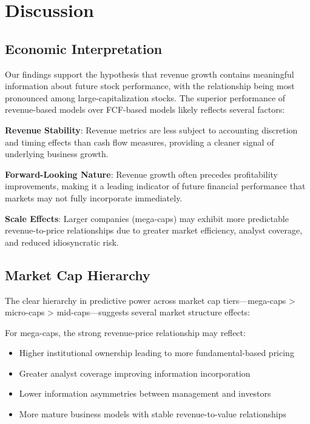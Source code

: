 \documentclass[11pt]{article}
\begin{document}
\section{Discussion}

\subsection{Economic Interpretation}

Our findings support the hypothesis that revenue growth contains meaningful information about future stock performance, with the relationship being most pronounced among large-capitalization stocks. The superior performance of revenue-based models over FCF-based models likely reflects several factors:

\textbf{Revenue Stability}: Revenue metrics are less subject to accounting discretion and timing effects than cash flow measures, providing a cleaner signal of underlying business growth.

\textbf{Forward-Looking Nature}: Revenue growth often precedes profitability improvements, making it a leading indicator of future financial performance that markets may not fully incorporate immediately.

\textbf{Scale Effects}: Larger companies (mega-caps) may exhibit more predictable revenue-to-price relationships due to greater market efficiency, analyst coverage, and reduced idiosyncratic risk.

\subsection{Market Cap Hierarchy}

The clear hierarchy in predictive power across market cap tiers—mega-caps > micro-caps > mid-caps—suggests several market structure effects:

For mega-caps, the strong revenue-price relationship may reflect:
\begin{itemize}
\item Higher institutional ownership leading to more fundamental-based pricing
\item Greater analyst coverage improving information incorporation
\item Lower information asymmetries between management and investors
\item More mature business models with stable revenue-to-value relationships
\end{itemize}
\end{document}
